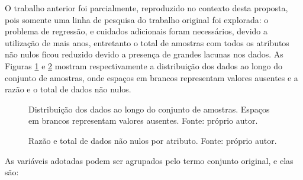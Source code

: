 O trabalho anterior \cite{REZENDE:2009} foi parcialmente, reproduzido no contexto desta proposta, pois somente uma linha de pesquisa do trabalho original foi explorada: o problema de regressão, e cuidados adicionais foram necessários, devido a utilização de mais anos, entretanto o total de amostras com todos os atributos não nulos ficou reduzido devido a presença de grandes lacunas nos dados. As Figuras \ref{fig:distribution} e \ref{fig:nulltotal} mostram respectivamente a distribuição dos dados ao longo do conjunto de amostras, onde espaços em brancos representam valores ausentes e a razão e o total de dados não nulos.

\begin{figure}[H]
\centering
{}
\caption{Distribuição dos dados ao longo do conjunto de amostras. Espaços em brancos representam valores ausentes. Fonte: próprio autor.}
\label{fig:distribution}
\end{figure}

\begin{figure}[H]
\centering
{}
\caption{Razão e total de dados não nulos por atributo. Fonte: próprio autor.}
\label{fig:nulltotal}
\end{figure}

As variáveis adotadas podem ser agrupados pelo termo conjunto original, e elas são:

